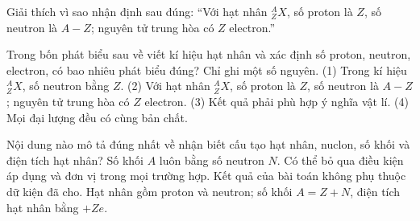\begin{bt}
Giải thích vì sao nhận định sau đúng: “Với hạt nhân $^{A}_{Z}X$, số proton là $Z$, số neutron là $A-Z$; nguyên tử trung hòa có $Z$ electron.”
\end{bt}

\begin{ex}
Trong bốn phát biểu sau về viết kí hiệu hạt nhân và xác định số proton, neutron, electron, có bao nhiêu phát biểu đúng? Chỉ ghi một số nguyên. (1) Trong kí hiệu $^{A}_{Z}X$, số neutron bằng $Z$. (2) Với hạt nhân $^{A}_{Z}X$, số proton là $Z$, số neutron là $A-Z$; nguyên tử trung hòa có $Z$ electron. (3) Kết quả phải phù hợp ý nghĩa vật lí. (4) Mọi đại lượng đều có cùng bản chất.
\end{ex}

\begin{ex}
Nội dung nào mô tả đúng nhất về nhận biết cấu tạo hạt nhân, nuclon, số khối và điện tích hạt nhân?
\choice
{Số khối $A$ luôn bằng số neutron $N$.}
{Có thể bỏ qua điều kiện áp dụng và đơn vị trong mọi trường hợp.}
{Kết quả của bài toán không phụ thuộc dữ kiện đã cho.}
{\True Hạt nhân gồm proton và neutron; số khối $A=Z+N$, điện tích hạt nhân bằng $+Ze$.}
\end{ex}

